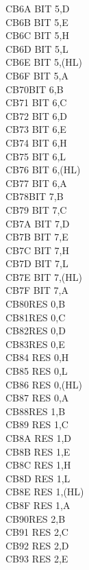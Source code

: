 \begin{multicols}{3}
{\begin{tabbing}
    CB6A\> 	BIT 5,D\\
    CB6B\> 	BIT 5,E\\
    CB6C\> 	BIT 5,H\\
    CB6D\> 	BIT 5,L\\
    CB6E\> 	BIT 5,(HL)\\
    CB6F\> 	BIT 5,A\\
    CB70\>BIT 6,B\\
    CB71\> 	BIT 6,C\\
    CB72\> 	BIT 6,D\\
    CB73\> 	BIT 6,E\\
    CB74\> 	BIT 6,H\\
    CB75\> 	BIT 6,L\\
    CB76\> 	BIT 6,(HL)\\
    CB77\> 	BIT 6,A\\
    CB78\>BIT 7,B\\
    CB79\> 	BIT 7,C\\
    CB7A\> 	BIT 7,D\\
    CB7B\> 	BIT 7,E\\
    CB7C\> 	BIT 7,H\\
    CB7D\> 	BIT 7,L\\
    CB7E\> 	BIT 7,(HL)\\
    CB7F\> 	BIT 7,A\\
    CB80\>RES 0,B\\
    CB81\>RES 0,C\\
    CB82\>RES 0,D\\
    CB83\>RES 0,E\\
    CB84\> 	RES 0,H\\
    CB85\> 	RES 0,L\\
    CB86\> 	RES 0,(HL)\\
    CB87\> 	RES 0,A\\
    CB88\>RES 1,B\\
    CB89\> 	RES 1,C\\
    CB8A\> 	RES 1,D\\
    CB8B\> 	RES 1,E\\
    CB8C\> 	RES 1,H\\
    CB8D\> 	RES 1,L\\
    CB8E\> 	RES 1,(HL)\\
    CB8F\> 	RES 1,A\\
    CB90\>RES 2,B\\
    CB91\> 	RES 2,C\\
    CB92\> 	RES 2,D\\
    CB93\> 	RES 2,E\\

\end{tabbing}}
\end{multicols}
